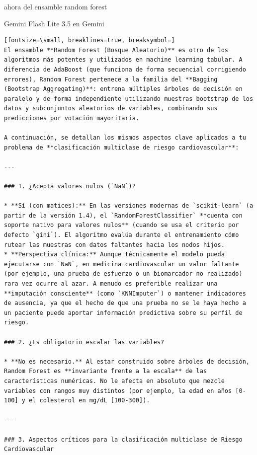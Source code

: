 \documentclass[12pt,a4paper,oneside]{book}
\begin{document}
\begin{iaprompt}
ahora del ensamble random forest
\end{iaprompt}
\begin{iaresp}{Gemini Flash Lite 3.5 en Gemini}
\begin{Verbatim}[fontsize=\small, breaklines=true, breaksymbol=]
El ensamble **Random Forest (Bosque Aleatorio)** es otro de los algoritmos más potentes y utilizados en machine learning tabular. A diferencia de AdaBoost (que funciona de forma secuencial corrigiendo errores), Random Forest pertenece a la familia del **Bagging (Bootstrap Aggregating)**: entrena múltiples árboles de decisión en paralelo y de forma independiente utilizando muestras bootstrap de los datos y subconjuntos aleatorios de variables, combinando sus predicciones por votación mayoritaria.

A continuación, se detallan los mismos aspectos clave aplicados a tu problema de **clasificación multiclase de riesgo cardiovascular**:

---

### 1. ¿Acepta valores nulos (`NaN`)?

* **Sí (con matices):** En las versiones modernas de `scikit-learn` (a partir de la versión 1.4), el `RandomForestClassifier` **cuenta con soporte nativo para valores nulos** (cuando se usa el criterio por defecto `gini`). El algoritmo evalúa durante el entrenamiento cómo rutear las muestras con datos faltantes hacia los nodos hijos.
* **Perspectiva clínica:** Aunque técnicamente el modelo pueda ejecutarse con `NaN`, en medicina cardiovascular un valor faltante (por ejemplo, una prueba de esfuerzo o un biomarcador no realizado) rara vez ocurre al azar. A menudo es preferible realizar una **imputación consciente** (como `KNNImputer`) o mantener indicadores de ausencia, ya que el hecho de que una prueba no se le haya hecho a un paciente puede aportar información predictiva sobre su perfil de riesgo.

### 2. ¿Es obligatorio escalar las variables?

* **No es necesario.** Al estar construido sobre árboles de decisión, Random Forest es **invariante frente a la escala** de las características numéricas. No le afecta en absoluto que mezcle variables con rangos muy distintos (por ejemplo, la edad en años [0-100] y el colesterol en mg/dL [100-300]).

---

### 3. Aspectos críticos para la clasificación multiclase de Riesgo Cardiovascular


\end{Verbatim}
\end{iaresp}
\end{document}
